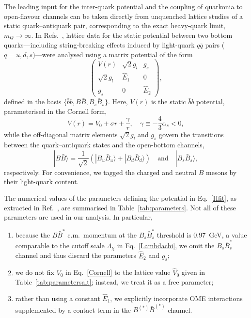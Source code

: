 \documentclass[aps,prd,showpacs,amsmath,twocolumn,superscriptaddress,floatfix,nofootinbib,notitlepage]{revtex4-2}
\newcommand{\be}{\begin{equation}}
\newcommand{\ee}{\end{equation}}
\begin{document}
The leading input for the inter-quark potential and the coupling of quarkonia to open-flavour channels can be taken directly from unquenched lattice studies of a static quark--antiquark pair, corresponding to the exact heavy-quark limit, $m_Q\to\infty$. In Refs.~\cite{Bulava:2019iut,Bulava:2024jpj}, lattice data for the static potential between two bottom quarks---including string-breaking effects induced by light-quark $q\bar{q}$ pairs ($q=u,d,s$)---were analysed using a matrix potential of the form
\be
\begin{pmatrix}
V(r)&\sqrt{2}g_l&g_s\\
\sqrt{2}g_l&\hat{E}_1&0\\
g_s&0&\hat{E}_2
\end{pmatrix},
\label{Hfit}
\ee
defined in the basis $\{\bar{b}b, B \bar{B}, B_s\bar{B}_s\}$.
Here, $V(r)$ is the static $\bar{b}b$ potential, parameterised in the Cornell form,
\be
V(r)=V_0+\sigma r+\frac{\gamma}{r},\quad \gamma\equiv-\frac43\alpha_s<0,
\label{Cornell}
\ee
while the off-diagonal matrix elements $\sqrt{2}g_l$ and $g_s$ govern the transitions between the quark--antiquark states and the open-bottom channels,
\be
|B\bar{B}\rangle=\frac{1}{\sqrt{2}}\left(|B_u\bar{B}_u\rangle+|B_d\bar{B}_d\rangle\right)\quad\mbox{and}\quad|B_s\bar{B}_s\rangle,
\label{BBstates}
\ee
respectively. For convenience, we tagged the charged and neutral $B$ mesons by their light-quark content.

The numerical values of the parameters defining the potential in Eq.~\eqref{Hfit}, as extracted in Ref.~\cite{Bulava:2024jpj}, are summarised in Table~\ref{tab:parameters}. Not all of these parameters are used in our analysis. In particular,
\begin{enumerate}[label=(\roman*)]
\item because the $B\bar{B}^*$ c.m.\ momentum at the $B_s\bar{B}_s^*$ threshold is 0.97~GeV, a value comparable to the cutoff scale $\Lambda_\chi$ in Eq.~\eqref{Lambdachi}, we omit the $B_s\bar{B}_s^*$ channel and thus discard the parameters $\hat{E}_2$ and $g_s$;
\item we do not fix $V_0$ in Eq.~\eqref{Cornell} to the lattice value $\hat{V}_0$ given in Table~\ref{tab:parametersalt}; instead, we treat it as a free parameter;
\item rather than using a constant $\hat{E}_1$, we explicitly incorporate OME interactions supplemented by a contact term in the $B^{(*)}\bar{B}^{(*)}$ channel.
\end{enumerate}
\end{document}
